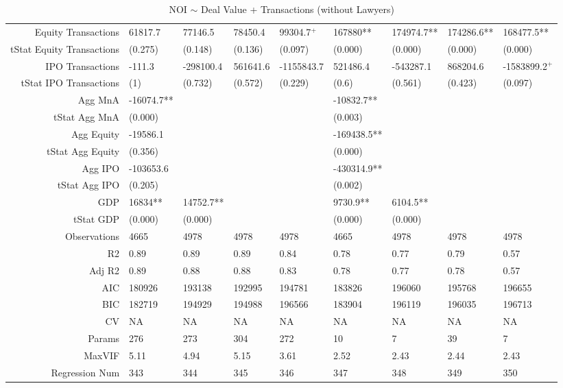 \begin{table}[ht]
\begin{tabular}{rllllllll}
  Equity Transactions & 61817.7 & 77146.5 & 78450.4 & 99304.7$^{+}$ & 167880** & 174974.7** & 174286.6** & 168477.5** \\ 
  tStat Equity Transactions & (0.275) & (0.148) & (0.136) & (0.097) & (0.000) & (0.000) & (0.000) & (0.000) \\ 
  IPO Transactions & -111.3 & -298100.4 & 561641.6 & -1155843.7 & 521486.4 & -543287.1 & 868204.6 & -1583899.2$^{+}$ \\ 
  tStat IPO Transactions & (1) & (0.732) & (0.572) & (0.229) & (0.6) & (0.561) & (0.423) & (0.097) \\ 
  Agg MnA & -16074.7** &  &  &  & -10832.7** &  &  &  \\ 
  tStat Agg MnA & (0.000) &  &  &  & (0.003) &  &  &  \\ 
  Agg Equity & -19586.1 &  &  &  & -169438.5** &  &  &  \\ 
  tStat Agg Equity & (0.356) &  &  &  & (0.000) &  &  &  \\ 
  Agg IPO & -103653.6 &  &  &  & -430314.9** &  &  &  \\ 
  tStat Agg IPO & (0.205) &  &  &  & (0.002) &  &  &  \\ 
  GDP & 16834** & 14752.7** &  &  & 9730.9** & 6104.5** &  &  \\ 
  tStat GDP & (0.000) & (0.000) &  &  & (0.000) & (0.000) &  &  \\ 
  Observations & 4665 & 4978 & 4978 & 4978 & 4665 & 4978 & 4978 & 4978 \\ 
  R2 & 0.89 & 0.89 & 0.89 & 0.84 & 0.78 & 0.77 & 0.79 & 0.57 \\ 
  Adj R2 & 0.89 & 0.88 & 0.88 & 0.83 & 0.78 & 0.77 & 0.78 & 0.57 \\ 
  AIC & 180926 & 193138 & 192995 & 194781 & 183826 & 196060 & 195768 & 196655 \\ 
  BIC & 182719 & 194929 & 194988 & 196566 & 183904 & 196119 & 196035 & 196713 \\ 
  CV & NA & NA & NA & NA & NA & NA & NA & NA \\ 
  Params & 276 & 273 & 304 & 272 & 10 & 7 & 39 & 7 \\ 
  MaxVIF & 5.11 & 4.94 & 5.15 & 3.61 & 2.52 & 2.43 & 2.44 & 2.43 \\ 
  Regression Num & 343 & 344 & 345 & 346 & 347 & 348 & 349 & 350 \\ 
   \hline
\end{tabular}
\caption{NOI $\sim$ Deal Value + Transactions (without Lawyers)} 
\end{table}
